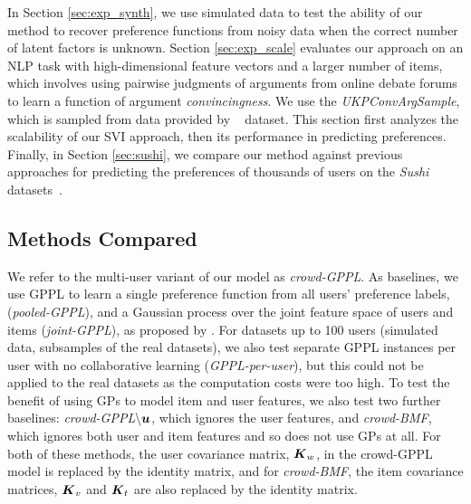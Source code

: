 In Section \ref{sec:exp_synth}, we use simulated data to test the ability of our method to recover preference functions from noisy data when the correct number of latent factors is unknown. 
Section \ref{sec:exp_scale} evaluates our approach on an NLP task with high-dimensional feature vectors and
a larger number of items, which involves using pairwise judgments of arguments from online debate forums 
to learn a function of argument \emph{convincingness}. We use the \emph{UKPConvArgSample},
which is
sampled from data provided by ~\citet{habernal2016argument} dataset.
This section first analyzes the scalability of our SVI approach, then its performance in 
predicting preferences. 
Finally, in Section \ref{sec:sushi}, we compare our method against previous approaches for predicting the preferences
of thousands of users on the \emph{Sushi} datasets~\citep{kamishima2003nantonac}.

\subsection{Methods Compared}

We refer to the multi-user variant of our model as \emph{crowd-GPPL}.
As baselines, we use GPPL to learn a single preference function from all users' preference labels, (\emph{pooled-GPPL}), and a Gaussian process over the joint feature space of users and items 
(\emph{joint-GPPL}), as proposed by \citet{guo2010gaussian}.
For datasets up to 100 users (simulated data, subsamples of the real datasets), 
we also test separate GPPL instances per user with no collaborative
learning (\emph{GPPL-per-user}), but this could not be applied to the real datasets as the 
computation costs were too high.
To test the benefit of using GPs to model item and user features,
we also test two further baselines: 
\emph{crowd-GPPL$\mathbf{\setminus \boldsymbol u}$}, which ignores the user features,
and \emph{crowd-BMF}, which ignores both user and item features and so does not use GPs at all. 
For both of these methods, the user covariance matrix, $\boldsymbol K_w$, in the crowd-GPPL model is replaced by the identity matrix, and for \emph{crowd-BMF}, the item covariance matrices, $\boldsymbol K_v$ and $\boldsymbol K_t$ are also replaced by the identity matrix.



